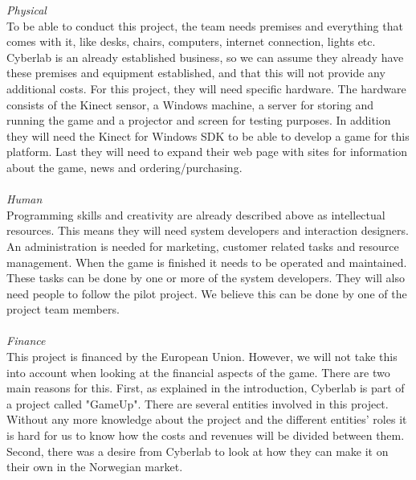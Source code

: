 \emph{Physical} \\ To be able to conduct this project, the team needs premises and everything that comes with it, like desks, chairs, computers, internet connection, lights etc. Cyberlab is an already established business, so we can assume they already have these premises and equipment established, and that this will not provide any additional costs. For this project, they will need specific hardware. The hardware consists of the Kinect sensor, a Windows machine, a server for storing and running the game and a projector and screen for testing purposes. In addition they will need the Kinect for Windows SDK to be able to develop a game for this platform. Last they will need to expand their web page with sites for information about the game, news and ordering/purchasing. \\ \\
\emph{Human} \\ Programming skills and creativity are already described above as intellectual resources. This means they will need system developers and interaction designers. An administration is needed for marketing, customer related tasks and resource management. When the game is finished it needs to be operated and maintained. These tasks can be done by one or more of the system developers. They will also need people to follow the pilot project. We believe this can be done by one of the project team members. \\ \\
\emph{Finance} \\ This project is financed by the European Union. However, we will not take this into account when looking at the financial aspects of the game. There are two main reasons for this. First, as explained in the introduction, Cyberlab is part of a project called "GameUp". There are several entities involved in this project. Without any more knowledge about the project and the different entities' roles it is hard for us to know how the costs and revenues will be divided between them. Second, there was a desire from Cyberlab to look at how they can make it on their own in the Norwegian market. 

